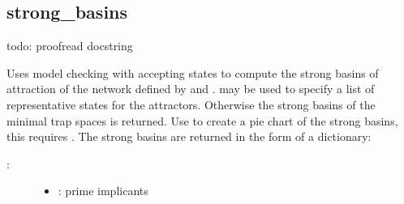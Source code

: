 \documentclass[letterpaper,10pt,english]{sphinxmanual}
\begin{document}
\subsection{strong\_basins}
\label{\detokenize{Basins:id5}}\label{\detokenize{Basins:strong-basins}}

\begin{fulllineitems}
\label{\detokenize{Basins:PyBoolNet.Basins.strong_basins}}
todo: proofread docstring

Uses model checking with accepting states to compute the strong basins of attraction of the network defined by  and .
 may be used to specify a list of representative states for the attractors.
Otherwise the strong basins of the minimal trap spaces is returned.
Use  to create a pie chart of the strong basins, this requires .
The strong basins are returned in the form of a dictionary:

\begin{sphinxVerbatim}[commandchars=\\\{\}]
     
          
                         
                          
               
\end{sphinxVerbatim}
\begin{description}
\item[{:}] \leavevmode\begin{itemize}
\item {} 
: prime implicants


\end{itemize}
\end{description}
\end{fulllineitems}
\end{document}
